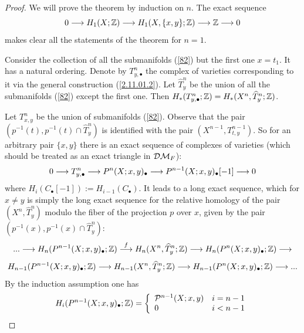 \documentclass[10pt]{article}
\begin{document}
\begin{proof} We will prove the theorem by induction on $n$. 
The exact sequence $$
0 \longrightarrow H_1(X;{\mathbb Z}) \longrightarrow H_1(X, \{x, y\};{\mathbb Z}) \longrightarrow {\mathbb Z} \longrightarrow 0
$$
makes clear all the statements of the theorem for $n=1$. 

Consider the collection  of all the submanifolds (\ref{82}) but the first one $x=t_1$. 
It has a natural ordering. Denote  by 
 $T_{y, \bullet}^n$ 
the complex of varieties corresponding to it via 
the general construction (\ref{2.11.01.2}). 
  Let   $\widehat T_y^n$  be the union of all the  
submanifolds (\ref{82}) except the first one. Then  
$H_*(T_{y, \bullet}^n; {\mathbb Z}) = H_*(X^n,  \widehat T_y^n; {\mathbb Z})$. 

Let   $T^n_{x,y}$ be the union of submanifolds (\ref{82}).   
Observe that the pair $(p^{-1}(t), p^{-1}(t) \cap \widehat T_y^n)$
is identified with the pair $(X^{n-1}, T^{n-1}_{t, y})$. 
So for an arbitrary pair $\{x,y\}$ there is an exact sequence of complexes of varieties
(which should be treated as an exact triangle in ${\cal D}{\cal M}_F$):
$$
0 \longrightarrow T_{y, \bullet}^n \longrightarrow {P}^n(X; x,y)_{\bullet} \longrightarrow {P}^{n-1}(X; x,y)_{\bullet}[-1] \longrightarrow 0
$$
  where $H_i(C_{\bullet}[-1]):= H_{i-1}(C_{\bullet})$. It leads to a long exact sequence, 
which for $x \not = y$ is simply the long exact sequence for the relative homology of the 
pair $(X^n,  \widehat T_y^n)$ modulo the fiber of the projection $p$ over $x$, given by the 
pair $(p^{-1}(x), p^{-1}(x) \cap \widehat T_y^n)$:
\begin{equation} \label{881*}
... \longrightarrow H_n(P^{n-1}(X; x,y)_{\bullet}; {\mathbb Z}) \stackrel{f}{\longrightarrow} 
H_n(X^n,  \widehat T_y^n; {\mathbb Z}) \longrightarrow H_n(P^{n}(X; x,y)_{\bullet}; {\mathbb Z}) \longrightarrow
\end{equation}
$$
 H_{n-1}(P^{n-1}(X; x,y)_{\bullet}; {\mathbb Z}) \longrightarrow 
H_{n-1}(X^n,  \widehat T_y^n; {\mathbb Z}) \longrightarrow 
H_{n-1}(P^{n}(X; x,y)_{\bullet}; {\mathbb Z}) \longrightarrow ...
$$
By the induction assumption 
one has
\begin{equation} \label{91}
H_{i}(P^{n-1}(X; x,y)_{\bullet}; {\mathbb Z}) = \left\{ \begin{array}{ll}
{\cal P}^{n-1}(X; x,y) & i=n-1\\ 
0 & i< n-1 \end{array}\right.
\end{equation}


\end{proof}
\end{document}
